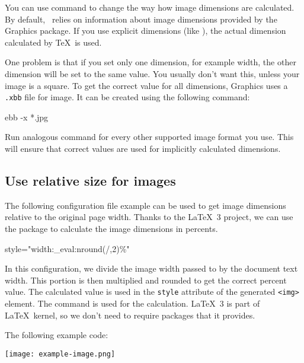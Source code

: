 You can use  command to change the way how image dimensions
are calculated. By default, \texfourht\ relies on information about image
dimensions provided by the Graphics package. If you use explicit dimensions
(like ), the actual dimension calculated by \TeX\ is used.

One problem is that if you set only one dimension, for example width, the other
dimension will be set to the same value. You usually don't want this, unless
your image is a square. To get the correct value for all dimensions, Graphics
uses a \verb|.xbb| file for image. It can be created using the following command:

\begin{shellcommand}
ebb -x *.jpg
\end{shellcommand}

Run analogous command for every other supported image format you use. This will
ensure that correct values are used for implicitly calculated dimensions.

\subsection{Use relative size for images}

The following configuration file example can be used to get image dimensions
relative to the original page width. Thanks to the \LaTeX\ 3 project, we can 
use the  package to calculate the image dimensions in percents. 

\begin{texsource}
\makeatletter
\ExplSyntaxOn
{}
{style="width:\fp_eval:n{round(\Gin@req@width/,2)}\%"}
\ExplSyntaxOff
\makeatother

\EndPreamble
\end{texsource}

In this configuration, we divide the image width passed to
 by the document text width. 
This portion is then multiplied and rounded to get the correct percent value.
The calculated value is used in the \verb|style| attribute of the generated \verb|<img>| element.
The  command  is used for the calculation. 
\LaTeX\ 3 is part of \LaTeX\ kernel, so we don't need to require packages that it provides.

The following example code:

\begin{texsource}
\texttt{[image: example-image.png]}
\end{texsource}

